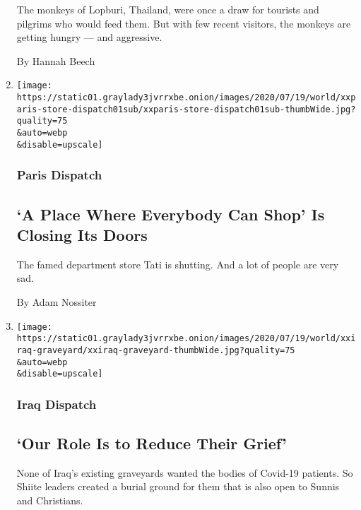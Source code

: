 \begin{enumerate}
  The monkeys of Lopburi, Thailand, were once a draw for tourists and
  pilgrims who would feed them. But with few recent visitors, the
  monkeys are getting hungry --- and aggressive.

  By Hannah Beech
\item
  \href{/2020/07/20/world/europe/france-paris-tati-coronavirus.html}{}

  \texttt{[image: https://static01.graylady3jvrrxbe.onion/images/2020/07/19/world/xxparis-store-dispatch01sub/xxparis-store-dispatch01sub-thumbWide.jpg?quality=75\\\&auto=webp\\\&disable=upscale]}

  \hypertarget{paris-dispatch}{%
  \subsubsection{Paris Dispatch}\label{paris-dispatch}}

  \hypertarget{a-place-where-everybody-can-shop-is-closing-its-doors}{%
  \subsection{`A Place Where Everybody Can Shop' Is Closing Its
  Doors}\label{a-place-where-everybody-can-shop-is-closing-its-doors}}

  The famed department store Tati is shutting. And a lot of people are
  very sad.

  By Adam Nossiter
\item
  \href{/2020/07/18/world/middleeast/iraq-coronovirus-cemetery.html}{}

  \texttt{[image: https://static01.graylady3jvrrxbe.onion/images/2020/07/19/world/xxiraq-graveyard/xxiraq-graveyard-thumbWide.jpg?quality=75\\\&auto=webp\\\&disable=upscale]}

  \hypertarget{iraq-dispatch}{%
  \subsubsection{Iraq Dispatch}\label{iraq-dispatch}}

  \hypertarget{our-role-is-to-reduce-their-grief}{%
  \subsection{`Our Role Is to Reduce Their
  Grief'}\label{our-role-is-to-reduce-their-grief}}

  None of Iraq's existing graveyards wanted the bodies of Covid-19
  patients. So Shiite leaders created a burial ground for them that is
  also open to Sunnis and Christians.


\end{enumerate}
